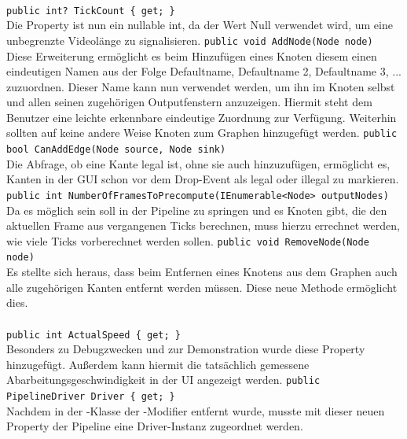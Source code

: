 \paragraph{}
\begin{itemize}
	\change \verb!public int? TickCount { get; }! \\
	Die Property ist nun ein nullable int, da der Wert Null verwendet wird, um eine unbegrenzte Videolänge zu signalisieren.
	\add \verb!public void AddNode(Node node)! \\
	Diese Erweiterung ermöglicht es beim Hinzufügen eines Knoten diesem einen eindeutigen Namen aus der Folge Defaultname, Defaultname 2, Defaultname 3, ... zuzuordnen. Dieser Name kann nun verwendet werden, um ihn im Knoten selbst und allen seinen zugehörigen Outputfenstern anzuzeigen. Hiermit steht dem Benutzer eine leichte erkennbare eindeutige Zuordnung zur Verfügung. Weiterhin sollten auf keine andere Weise Knoten zum Graphen hinzugefügt werden.
	\add \verb!public bool CanAddEdge(Node source, Node sink)! \\
	Die Abfrage, ob eine Kante legal ist, ohne sie auch hinzuzufügen, ermöglicht es, Kanten in der GUI schon vor dem Drop-Event als legal oder illegal zu markieren.
	\add \verb!public int NumberOfFramesToPrecompute(IEnumerable<Node> outputNodes)! \\
	Da es möglich sein soll in der Pipeline zu springen und es Knoten gibt, die den aktuellen Frame aus vergangenen Ticks berechnen, muss hierzu errechnet werden, wie viele Ticks vorberechnet werden sollen.
	\add \verb!public void RemoveNode(Node node)! \\
	Es stellte sich heraus, dass beim Entfernen eines Knotens aus dem Graphen auch alle zugehörigen Kanten entfernt werden müssen. Diese neue Methode ermöglicht dies.
\end{itemize}

\paragraph{}
\begin{itemize}
	\add \verb!public int ActualSpeed { get; }! \\
	Besonders zu Debugzwecken und zur Demonstration wurde diese Property hinzugefügt. Außerdem kann hiermit die tatsächlich gemessene Abarbeitungsgeschwindigkeit in der UI angezeigt werden.
	\add \verb!public PipelineDriver Driver { get; }! \\
	Nachdem in der -Klasse der -Modifier entfernt wurde, musste mit dieser neuen Property der Pipeline eine Driver-Instanz zugeordnet werden.
\end{itemize}
\newpage

